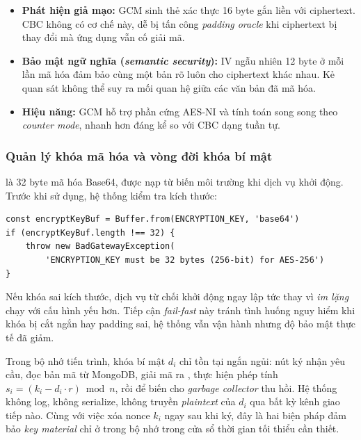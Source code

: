 \begin{itemize}
    \item \textbf{Phát hiện giả mạo:} GCM sinh thẻ xác thực 16 byte gắn liền với ciphertext. CBC không có cơ chế này, dễ bị tấn công \textit{padding oracle} khi ciphertext bị thay đổi mà ứng dụng vẫn cố giải mã.

    \item \textbf{Bảo mật ngữ nghĩa (\textit{semantic security}):} IV ngẫu nhiên 12 byte ở mỗi lần mã hóa đảm bảo cùng một bản rõ luôn cho ciphertext khác nhau. Kẻ quan sát không thể suy ra mối quan hệ giữa các văn bản đã mã hóa.

    \item \textbf{Hiệu năng:} GCM hỗ trợ phần cứng AES-NI và tính toán song song theo \textit{counter mode}, nhanh hơn đáng kể so với CBC dạng tuần tự.
\end{itemize}

\subsubsection{Quản lý khóa mã hóa và vòng đời khóa bí mật}

 là 32 byte mã hóa Base64, được nạp từ biến môi trường khi dịch vụ khởi động. Trước khi sử dụng, hệ thống kiểm tra kích thước:

\begin{verbatim}
const encryptKeyBuf = Buffer.from(ENCRYPTION_KEY, 'base64')
if (encryptKeyBuf.length !== 32) {
    throw new BadGatewayException(
        'ENCRYPTION_KEY must be 32 bytes (256-bit) for AES-256')
}
\end{verbatim}

Nếu khóa sai kích thước, dịch vụ từ chối khởi động ngay lập tức thay vì \textit{im lặng} chạy với cấu hình yếu hơn. Tiếp cận \textit{fail-fast} này tránh tình huống nguy hiểm khi khóa bị cắt ngắn hay padding sai, hệ thống vẫn vận hành nhưng độ bảo mật thực tế đã giảm.

Trong bộ nhớ tiến trình, khóa bí mật $d_i$ chỉ tồn tại ngắn ngủi: nút ký nhận yêu cầu, đọc bản mã từ MongoDB, giải mã ra , thực hiện phép tính $s_i = (k_i - d_i \cdot r) \bmod n$, rồi để biến  cho \textit{garbage collector} thu hồi. Hệ thống không log, không serialize, không truyền \textit{plaintext} của $d_i$ qua bất kỳ kênh giao tiếp nào. Cùng với việc xóa nonce $k_i$ ngay sau khi ký, đây là hai biện pháp đảm bảo \textit{key material} chỉ ở trong bộ nhớ trong cửa sổ thời gian tối thiểu cần thiết.
